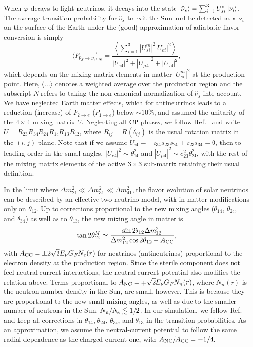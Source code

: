 \documentclass[
reprint,
superscriptaddress,
showpacs,
preprintnumbers,
nofootinbib,
nobibnotes,
amsmath,
amssymb, 
aps,
prd,
floatfix
]{revtex4-1}
\renewcommand{\phi}{\varphi}
\begin{document}
When $\phi$ decays to light neutrinos, it decays into the state $\ket{\hat{\nu}_s} = \sum_{i=1}^3 U_{s i}^* \ket{\nu_i}$. The average transition probability for $\hat{\nu}_s$ to exit the Sun and be detected as a $\nu_e$ on the surface of the Earth under the (good) approximation of adiabatic flavor conversion is simply 
\begin{equation}\label{eq:pse}
    \langle P_{\hat{\nu}_S\to \nu_e} \rangle_N = \frac{ \left\langle\sum_{i=1}^3 |U_{si}^m|^2|U_{ei}|^2\right\rangle}{|U_{e 4}|^2+|U_{\mu 4}|^2+|U_{\tau 4}|^2},
\end{equation}
which depends on the mixing matrix elements in matter $|U_{si}^m|^2$ at the production point. Here, $\langle \dots \rangle$ denotes a weighted average over the production region and the subscript $N$ refers to taking the non-canonical normalization of $\hat{\nu}_s$ into account. We have neglected Earth matter effects, which for antineutrinos leads to a reduction (increase) of $P_{2\to e}$ ($P_{1\to e}$) below $\sim10\%$, and assumed the unitarity of the $4\times4$ mixing matrix $U$. Neglecting all CP phases, we follow Ref.~\cite{Palazzo:2011rj} and write $U = R_{23} R_{34}R_{24}R_{14} R_{13} R_{12}$, where $R_{ij}=R(\theta_{ij})$ is the usual rotation matrix in the $(i,j)$ plane. Note that if we assume $U_{\tau 4}=-c_{34}s_{23}s_{24}+c_{23}s_{34}=0$, then to leading order in the small angles, $|U_{e4}|^2\sim \theta_{14}^2$ and $|U_{\mu4}|^2\sim c_{23}^2\theta_{24}^2$, with the rest of the mixing matrix elements of the active $3\times 3$ sub-matrix retaining their usual definition. 


In the limit where $\Delta m^2_{21}\ll\Delta m^2_{31}\ll\Delta m^2_{41}$, the flavor evolution of solar neutrinos can be described by an effective two-neutrino model, with in-matter modifications only on $\theta_{12}$. Up to corrections proportional to the new mixing angles ($\theta_{14}$, $\theta_{24}$, and $\theta_{34}$) as well as to $\theta_{13}$, the new mixing angle in matter is
\begin{equation}
    \tan{2\theta^M_{12}} \simeq \frac{\sin{2 \theta_{12}} \Delta m^2_{12} }{\Delta m^2_{12} \cos{2 \theta_{12}} - A_{\rm CC}},
\end{equation}
with $A_{\rm CC} = \pm 2\sqrt{2} E_\nu G_F N_e(r)$ for neutrinos (antineutrinos) proportional to the electron density at the production region. Since the sterile component does not feel neutral-current interactions, the neutral-current potential also modifies the relation above. Terms proportional to $A_{\rm NC} = \mp \sqrt{2} E_\nu G_F N_{n}(r)$, where $N_n(r)$ is the neutron number density in the Sun, are small, however. This is because they are proportional to the new small mixing angles, as well as due to the smaller number of neutrons in the Sun, $N_{\rm n}/N_{e} \lesssim 1/2$. In our simulation, we follow Ref.~\cite{Palazzo:2011rj} and keep all corrections in $\theta_{14}$, $\theta_{24}$, $\theta_{34}$, and $\theta_{13}$ in the transition probabilities. As an approximation, we assume the neutral-current potential to follow the same radial dependence as the charged-current one, with $A_{\rm NC}/A_{\rm CC} = -1/4$.
\end{document}

